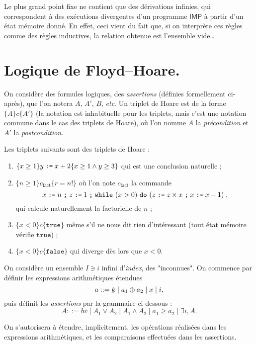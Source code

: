 \documentclass[../main]{subfiles}
\begin{document}
  Le plus grand point fixe ne contient que des dérivations infinies, qui correspondent à des exécutions divergentes d’un programme $\mathsf{IMP}$ à partir d’un état mémoire donné.
  En effet, ceci vient du fait que, si on interprète ces règles comme des règles inductives, la relation obtenue est l'ensemble vide\ldots

  \section{Logique de Floyd--Hoare.}

  On considère des formules logiques, des \textit{assertions} (définies formellement ci-après), que l'on notera $A$, $A'$, $B$, \textit{etc}.
  Un triplet de Hoare est de la forme $\{A\} c \{A'\}$ (la notation est inhabituelle pour les triplets, mais c'est une notation commune dans le cas des triplets de Hoare), où l'on nomme $A$ la \textit{précondition} et $A'$ la \textit{postcondition}.

  \begin{exm}
    Les triplets suivants sont des triplets de Hoare :
    \begin{enumerate}
      \item $\{x \ge 1\} y \mathrel{\texttt{:=}} x + 2 \{x\ge 1 \land y \ge 3\}$ qui est une conclusion naturelle ;
      \item $\{n \ge 1\} c_\text{fact} \{r = n!\}$ où l'on note $c_\text{fact}$ la commande \[
          x \mathrel{\texttt{:=}} n\mathrel{\texttt{;}} z \mathrel{\texttt{:=}} 1 \mathrel{\texttt{;}} \texttt{while}\ (x > 0)\ \texttt{do}\ (z \mathrel{\texttt{:=}} z \times x \mathrel{\texttt{;}} x \mathrel{\texttt{:=}} x - 1)\;
        ,\]
        qui calcule naturellement la factorielle de $n$ ;
      \item $\{x < 0\} c \{\mathtt{true}\}$ même s'il ne nous dit rien d'intéressant (tout état mémoire vérifie $\mathtt{true}$) ;
      \item $\{x < 0\}c \{\mathtt{false}\}$ qui diverge dès lors que $x < 0$.
    \end{enumerate}
  \end{exm}

  On considère un ensemble $I \ni i$ infini d'\textit{index}, des "inconnues".
  On commence par définir les expressions arithmétiques étendues \[
    a ::= \ubar{k}  \mid a_1 \oplus a_2  \mid x  \mid i
  ,\]
  puis définit les \textit{assertions} par la grammaire ci-dessous :
  \[
    A ::= bv  \mid A_1 \lor A_2  \mid A_1 \land A_2 \mid a_1 \ge a_2  \mid \exists i, A
  .\]

  On s'autorisera à étendre, implicitement, les opérations réalisées dans les expressions arithmétiques, et les comparaisons effectuées dans les assertions.
\end{document}
